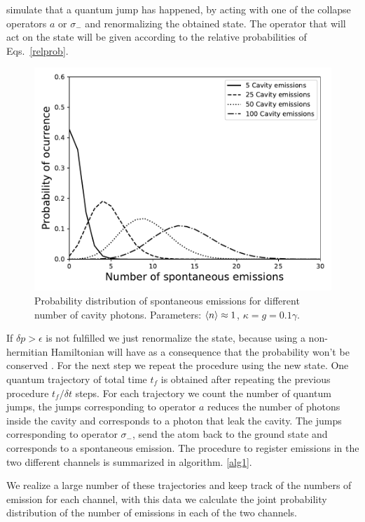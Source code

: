 \documentclass[epj,final]{svjour}
\begin{document}
simulate that a quantum jump has happened, by acting with one of the
collapse operators $a$ or $\sigma_-$ and renormalizing the obtained
state. The operator that will act on the state will be given according
to the relative probabilities of Eqs.~\eqref{relprob}.
\begin{figure}[!t] 
\centering
\includegraphics[scale = 0.5]{distributioneng.pdf}
\caption{Probability distribution of spontaneous emissions for
  different number of cavity photons. Parameters: $\expval{n} \approx 1$, $\kappa = g = 0.1\gamma$. } \label{probdiss}
\end{figure}
If $\delta p > \epsilon$ is not fulfilled we just renormalize the
state, because using a non-hermitian Hamiltonian will have as a
consequence that the probability won't be conserved
\cite{Sakurai:1167961}. For the next step we repeat the procedure
using the new state. One quantum trajectory of total time $t_f$ is
obtained after repeating the previous procedure $t_f/\delta t$ steps.
For each trajectory we count the number of quantum jumps, the jumps
corresponding to operator $a$ reduces the number of photons inside the
cavity and corresponds to a photon that leak the cavity. The jumps
corresponding to operator $\sigma_-$, send the atom back to the ground
state and corresponds to a spontaneous emission. The procedure to
register emissions in the two different channels is summarized in
algorithm. \ref{alg1}.

We realize a large number of these trajectories and keep track of the
numbers of emission for each channel, with this data we calculate
the joint probability distribution of the number of emissions in each
of the two channels.
\end{document}
